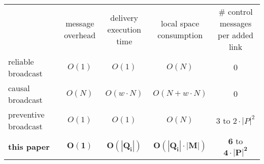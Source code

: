\newcommand{\cmark}{\ding{51}}%
\newcommand{\xmark}{\ding{55}}%


\small

\begin{tabularx}{1\columnwidth}{@{}Xcccc@{}}
  & \makecell{message\\overhead} &  \makecell{delivery\\execution time} & \makecell{local space\\consumption} & \makecell{\# control messages\\per added link} \\ \cmidrule{2-5}
  reliable broadcast~\cite{hadzilacos1994modular} & $O(1)$ & $O(1)$ & $O(N)$ & $0$ \\
  causal broadcast~\cite{schwarz1994detecting} & $O(N)$ & $O(w \cdot N)$ & $O(N+w\cdot N)$ & $0$ \\ 
  preventive broadcast~\cite{nedelec2018pcbroadcast} & $O(1)$ & $O(1)$ & $O(N)$ & $3$ to $2\cdot |P|^2$ \\ \hline\hline
  \textbf{this paper} & $\mathbf{O(1)}$ & $\mathbf{O(|Q_i|)}$ & $\mathbf{O(|Q_i| \cdot |M|)}$ & $\mathbf{6}$ to $\mathbf{4\cdot|P|^2}$ \\
\end{tabularx}

